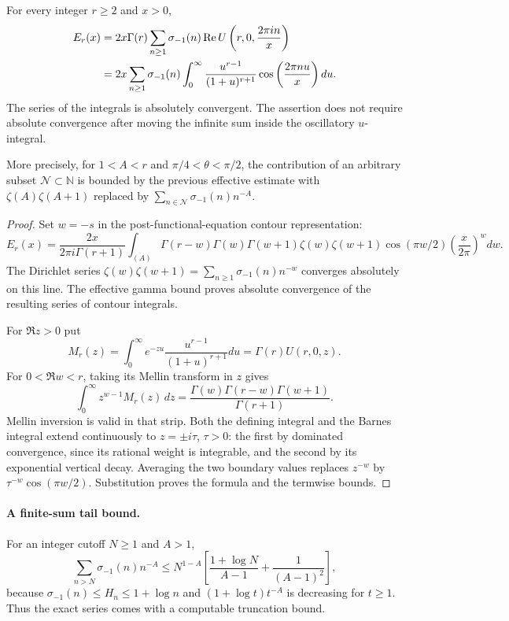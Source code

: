 \begin{theorem}\label{thm:herglotz-sectors}
For every integer $r\ge2$ and $x>0$,
\begin{align*}
 E_r(x)
 &=2x\Gamma(r)\sum_{n\ge1}\sigma_{-1}(n)
       \operatorname{Re} U\left(r,0,\frac{2\pi i n}{x}\right)\\
 &=2x\sum_{n\ge1}\sigma_{-1}(n)
   \int_0^\infty\frac{u^{r-1}}{(1+u)^{r+1}}
        \cos\left(\frac{2\pi n u}{x}\right)du.
\end{align*}
The series of the integrals is absolutely convergent. The assertion does
not require absolute convergence after moving the infinite sum inside
the oscillatory $u$-integral.

More precisely, for $1<A<r$ and $\pi/4<\theta<\pi/2$, the contribution
of an arbitrary subset $\mathcal N\subset\mathbb N$ is bounded by the
previous effective estimate with $\zeta(A)\zeta(A+1)$ replaced by
$\sum_{n\in\mathcal N}\sigma_{-1}(n)n^{-A}$.
\end{theorem}

\begin{proof}
Set $w=-s$ in the post-functional-equation contour representation:
\[
 E_r(x)=\frac{2x}{2\pi i\Gamma(r+1)}
 \int_{(A)}\Gamma(r-w)\Gamma(w)\Gamma(w+1)
 \zeta(w)\zeta(w+1)\cos(\pi w/2)
 \left(\frac{x}{2\pi}\right)^w dw.
\]
The Dirichlet series
$\zeta(w)\zeta(w+1)=\sum_{n\ge1}\sigma_{-1}(n)n^{-w}$
converges absolutely on this line. The effective gamma bound proves
absolute convergence of the resulting series of contour integrals.

For $\Re z>0$ put
\[
 M_r(z)=\int_0^\infty e^{-zu}
        \frac{u^{r-1}}{(1+u)^{r+1}}du=\Gamma(r)U(r,0,z).
\]
For $0<\Re w<r$, taking its Mellin transform in $z$ gives
\[
 \int_0^\infty z^{w-1}M_r(z)\,dz
 =\frac{\Gamma(w)\Gamma(r-w)\Gamma(w+1)}{\Gamma(r+1)}.
\]
Mellin inversion is valid in that strip. Both the defining integral
and the Barnes integral extend continuously to $z=\pm i\tau$, $\tau>0$:
the first by dominated convergence, since its rational weight is
integrable, and the second by its exponential vertical decay. Averaging
the two boundary values replaces $z^{-w}$ by
$\tau^{-w}\cos(\pi w/2)$. Substitution proves the formula and the
termwise bounds.
\end{proof}

\paragraph{A finite-sum tail bound.}
For an integer cutoff $N\ge1$ and $A>1$,
\[
 \sum_{n>N}\sigma_{-1}(n)n^{-A}
 \le N^{1-A}\left[\frac{1+\log N}{A-1}
                       +\frac1{(A-1)^2}\right],
\]
because $\sigma_{-1}(n)\le H_n\le1+\log n$ and
$(1+\log t)t^{-A}$ is decreasing for $t\ge1$.
Thus the exact series comes with a computable truncation bound.

